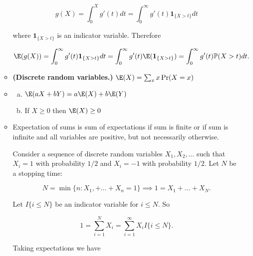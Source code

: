 \begin{itemize}
\begin{itemize}
\begin{remark}
\[
g(X) = \int_0^X g'(t) dt = \int_0^\infty g'(t) \boldsymbol{1}_{\{X > t\}} dt
\]

where \(\boldsymbol{1}_{\{X > t\}}\) is an indicator variable. Therefore 

\[
\E(g(X)) = \int_0^\infty g'(t) \boldsymbol{1}_{\{X > t\}} dt = \int_0^\infty g'(t) \E(\boldsymbol{1}_{\{X > t\}}) = \int_0^\infty g'(t) \mathbb{P}(X > t) dt.
\]

\end{remark}

\item \begin{definition} \textbf{(Discrete random variables.)} \(\E(X) = \sum_x x \Pr(X = x)\) \end{definition}

\item \begin{theorem} 

\begin{enumerate}[(a)]

\item \(\E(aX + bY) = a \E(X) + b \E(Y)\) 

\item If \(X \geq 0\) then \(\E(X) \geq 0\)

\end{enumerate}
\end{theorem}

\item \begin{theorem}Expectation of sums is sum of expectations if sum is finite or if sum is infinite and all variables are positive, but not necessarily otherwise.

\end{theorem}

\begin{example}\label{prob.ex.cont.sum.ex} Consider a sequence of discrete random variables \(X_1, X_2, \ldots\) such that \(X_i = 1 \) with probability \(1/2\) and \(X_i = - 1\) with probability \(1/2\). Let \(N\) be a stopping time:

\[
N = \min \{n: X_1, + \ldots + X_n = 1\} \implies 1 = X_1 + \ldots + X_N.
\] 

Let \(I\{i \leq N\}\) be an indicator variable for \(i \leq N\). So

\[
1 = \sum_{i=1}^N X_i = \sum_{i=1}^\infty X_i I\{i \leq N\}.
\]

Taking expectations we have


\end{example}
\end{itemize}
\end{itemize}

